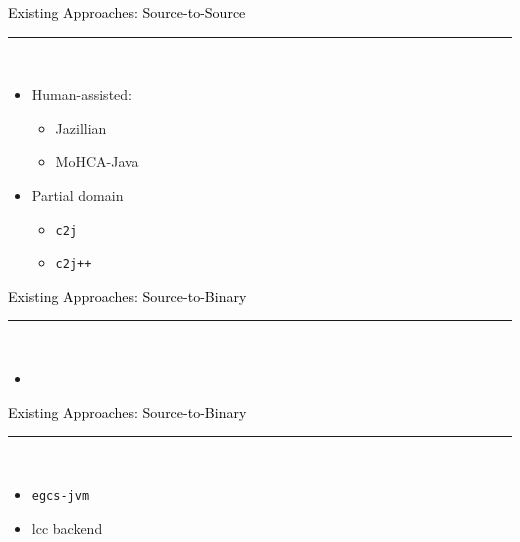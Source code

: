 \documentclass[letter]{seminar}
\begin{document}
\begin{slide}\raggedright
\renewcommand{\leftmargini}{5mm}
{\Large{\textcolor{black}{Existing Approaches: Source-to-Source}}}
\\\rule{\textwidth}{0.1pt}\\

\begin{itemize}


\item
         Human-assisted:
\begin{itemize}


\item
             Jazillian

\item
             MoHCA-Java
\end{itemize}


\item
         Partial domain
\begin{itemize}


\item
             {\texttt{c2j}}

\item
             {\texttt{c2j++}}


\end{itemize}

\end{itemize}


\end{slide}


\begin{slide}\raggedright
\renewcommand{\leftmargini}{5mm}
{\Large{\textcolor{black}{Existing Approaches: Source-to-Binary}}}
\\\rule{\textwidth}{0.1pt}\\

\begin{itemize}

\item \begin{figure}[H]
\begin{center}
\end{center}
\end{figure}

\end{itemize}


\end{slide}


\begin{slide}\raggedright
\renewcommand{\leftmargini}{5mm}
{\Large{\textcolor{black}{Existing Approaches: Source-to-Binary}}}
\\\rule{\textwidth}{0.1pt}\\

\begin{itemize}


\item
         {\texttt{egcs-jvm}}

\item
         lcc backend


\end{itemize}


\end{slide}
\end{document}
